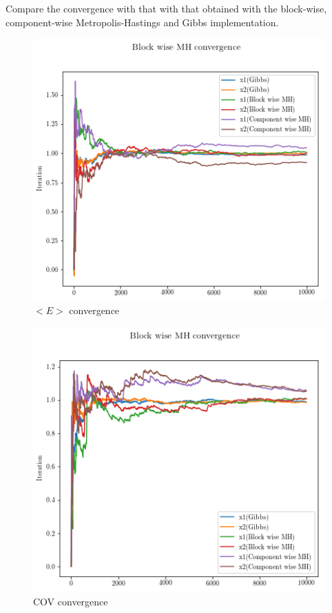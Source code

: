 \documentclass{article}
\begin{document}
Compare the convergence with that with that obtained with the block-wise, component-wise Metropolis-Hastings and Gibbs implementation.

\begin{figure}[h!]
\centering
\includegraphics[scale=0.45]{HW4P44.png}
\caption{$<E>$ convergence}
\end{figure}

\begin{figure}[h!]
\centering
\includegraphics[scale=0.45]{HW4P45.png}
\caption{COV convergence}
\end{figure}
\end{document}
